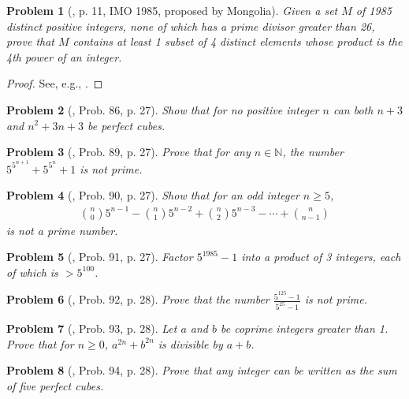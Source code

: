 \documentclass[oneside]{book}
\numberwithin{equation}{section}
\newtheorem{problem}{Problem}[section]
\begin{document}
\begin{problem}[\cite{Gelca_Andreescu2017}, p. 11, IMO 1985, proposed by Mongolia]
	Given a set $M$ of 1985 distinct positive integers, none of which has a prime divisor greater than 26, prove that $M$ contains at least 1 subset of 4 distinct elements whose product is the 4th power of an integer.
\end{problem}

\begin{proof}[Proof]
	See, e.g., \cite[pp. 11--12]{Gelca_Andreescu2017}.
\end{proof}

\begin{problem}[\cite{Gelca_Andreescu2017}, Prob. 86, p. 27]
	Show that for no positive integer $n$ can both $n + 3$ and $n^2 + 3n + 3$ be perfect cubes.
\end{problem}

\begin{problem}[\cite{Gelca_Andreescu2017}, Prob. 89, p. 27]
	Prove that for any $n\in\mathbb{N}$, the number $5^{5^{n+1}} + 5^{5^n} + 1$ is not prime.
\end{problem}

\begin{problem}[\cite{Gelca_Andreescu2017}, Prob. 90, p. 27]
	Show that for an odd integer $n\ge 5$,
	\begin{align}
		\binom{n}{0}5^{n-1} - \binom{n}{1}5^{n-2} + \binom{n}{2}5^{n-3} - \cdots + \binom{n}{n - 1}
	\end{align}
	is not a prime number.
\end{problem}

\begin{problem}[\cite{Gelca_Andreescu2017}, Prob. 91, p. 27]
	Factor $5^{1985} - 1$ into a product of 3 integers, each of which is $> 5^{100}$.
\end{problem}

\begin{problem}[\cite{Gelca_Andreescu2017}, Prob. 92, p. 28]
	Prove that the number $\frac{5^{125} - 1}{5^{25} - 1}$ is not prime.
\end{problem}

\begin{problem}[\cite{Gelca_Andreescu2017}, Prob. 93, p. 28]
	Let $a$ and $b$ be coprime integers greater than 1. Prove that for $n\ge 0$, $a^{2n} + b^{2n}$ is divisible by $a + b$.
\end{problem}

\begin{problem}[\cite{Gelca_Andreescu2017}, Prob. 94, p. 28]
	Prove that any integer can be written as the sum of five perfect cubes.
\end{problem}
\end{document}
